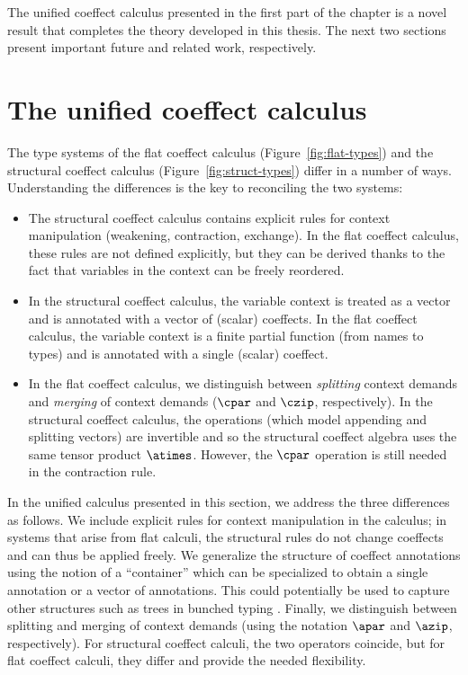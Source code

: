 \noindent
The unified coeffect calculus presented in the first part of the chapter is a novel result that
completes the theory developed in this thesis. The next two sections present important future and
related work, respectively.


\section{The unified coeffect calculus}
\label{sec:further-unified}

The type systems of the flat coeffect calculus (Figure~\ref{fig:flat-types}) and the structural
coeffect calculus (Figure~\ref{fig:struct-types}) differ in a number of ways. Understanding the
differences is the key to reconciling the two systems:

\begin{itemize}
\item The structural coeffect calculus contains explicit rules for context manipulation
  (weakening, contraction, exchange). In the flat coeffect calculus, these rules are not defined
  explicitly, but they can be derived thanks to the fact that variables in the context can be
  freely reordered.

\item In the structural coeffect calculus, the variable context is treated as a vector
  and is annotated with a vector of (scalar) coeffects. In the flat coeffect calculus,
  the variable context is a finite partial function (from names to types) and is annotated with
  a single (scalar) coeffect.

\item In the flat coeffect calculus, we distinguish between \emph{splitting} context demands
  and \emph{merging} of context demands ($\cpar$ and $\czip$, respectively). In the structural
  coeffect calculus, the operations (which model appending and splitting vectors) are invertible
  and so the structural coeffect algebra uses the same tensor product $\atimes$. However, the
  $\cpar$ operation is still needed in the contraction rule.
\end{itemize}

\noindent
In the unified calculus presented in this section, we address the three differences as follows.
We include explicit rules for context manipulation in the calculus; in systems that arise from flat
calculi, the structural rules do not change coeffects and can thus be applied freely. We generalize
the structure of coeffect annotations using the notion of a ``container'' which can be specialized
to obtain a single annotation or a vector of annotations. This could potentially be used to capture
other structures such as trees in bunched typing \cite{substruct-bunched}. Finally, we distinguish
between splitting and merging of context demands (using the notation $\apar$ and $\azip$,
respectively). For structural coeffect calculi, the two operators coincide, but for flat
coeffect calculi, they differ and provide the needed flexibility.

